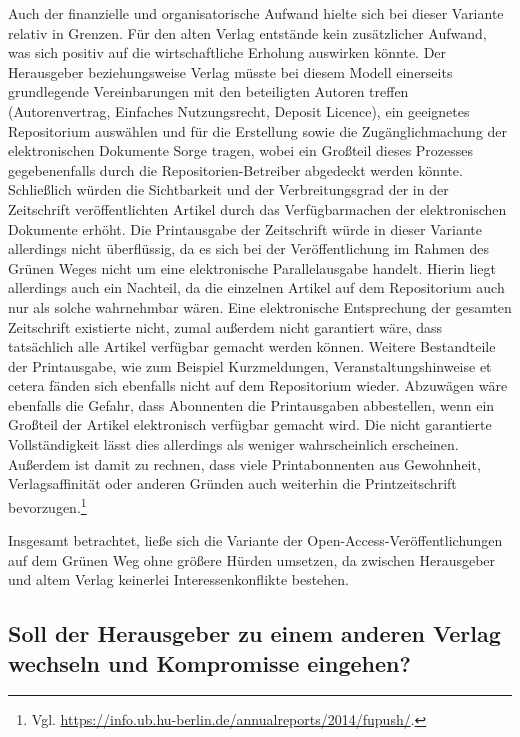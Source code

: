 \documentclass[a4paper,
fontsize=11pt,
oneside,
numbers=noperiodatend,
parskip=half-,
bibliography=totoc,
final
]{scrartcl}
\begin{document}
Auch der finanzielle und organisatorische Aufwand hielte sich bei dieser
Variante relativ in Grenzen. Für den alten Verlag entstände kein
zusätzlicher Aufwand, was sich positiv auf die wirtschaftliche Erholung
auswirken könnte. Der Herausgeber beziehungsweise Verlag müsste bei
diesem Modell einerseits grundlegende Vereinbarungen mit den beteiligten
Autoren treffen (Autorenvertrag, Einfaches Nutzungsrecht, Deposit
Licence), ein geeignetes Repositorium auswählen und für die Erstellung
sowie die Zugänglichmachung der elektronischen Dokumente Sorge tragen,
wobei ein Großteil dieses Prozesses gegebenenfalls durch die
Repositorien-Betreiber abgedeckt werden könnte. Schließlich würden die
Sichtbarkeit und der Verbreitungsgrad der in der Zeitschrift
veröffentlichten Artikel durch das Verfügbarmachen der elektronischen
Dokumente erhöht. Die Printausgabe der Zeitschrift würde in dieser
Variante allerdings nicht überflüssig, da es sich bei der
Veröffentlichung im Rahmen des Grünen Weges nicht um eine elektronische
Parallelausgabe handelt. Hierin liegt allerdings auch ein Nachteil, da
die einzelnen Artikel auf dem Repositorium auch nur als solche
wahrnehmbar wären. Eine elektronische Entsprechung der gesamten
Zeitschrift existierte nicht, zumal außerdem nicht garantiert wäre, dass
tatsächlich alle Artikel verfügbar gemacht werden können. Weitere
Bestandteile der Printausgabe, wie zum Beispiel Kurzmeldungen,
Veranstaltungshinweise et cetera fänden sich ebenfalls nicht auf dem
Repositorium wieder. Abzuwägen wäre ebenfalls die Gefahr, dass
Abonnenten die Printausgaben abbestellen, wenn ein Großteil der Artikel
elektronisch verfügbar gemacht wird. Die nicht garantierte
Vollständigkeit lässt dies allerdings als weniger wahrscheinlich
erscheinen. Außerdem ist damit zu rechnen, dass viele Printabonnenten
aus Gewohnheit, Verlagsaffinität oder anderen Gründen auch weiterhin die
Printzeitschrift bevorzugen.\footnote{Vgl.
  \url{https://info.ub.hu-berlin.de/annualreports/2014/fupush/}.}

Insgesamt betrachtet, ließe sich die Variante der
Open-Access-Veröffentlichungen auf dem Grünen Weg ohne größere Hürden
umsetzen, da zwischen Herausgeber und altem Verlag keinerlei
Interessenkonflikte bestehen.

\subsection*{Soll der Herausgeber zu einem anderen Verlag wechseln und
Kompromisse
eingehen?}\label{soll-der-herausgeber-zu-einem-anderen-verlag-wechseln-und-kompromisse-eingehen}
\end{document}

